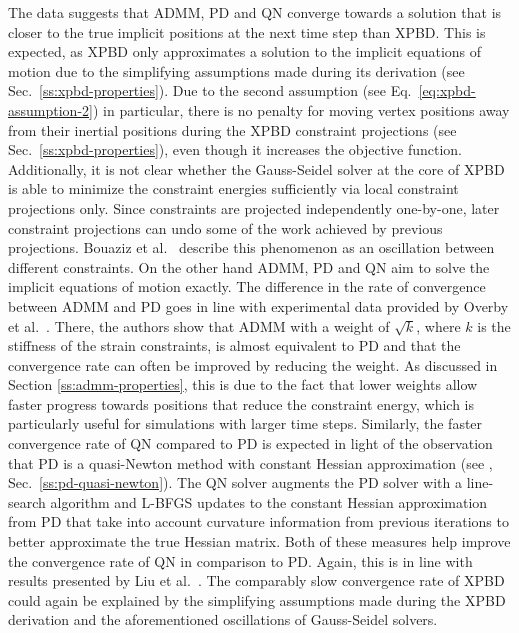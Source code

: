 The data suggests that ADMM, PD and QN converge towards a solution that is closer to the true implicit positions at the next time step than XPBD. This is expected, 
as XPBD only approximates a solution to the implicit equations of motion due to the simplifying assumptions made during its derivation (see Sec.\ \ref{ss:xpbd-properties}).
Due to the second assumption (see Eq.\ \ref{eq:xpbd-assumption-2}) in particular, there is no penalty for moving vertex positions away from their inertial positions during 
the XPBD constraint projections (see Sec.\ \ref{ss:xpbd-properties}), even though it increases the objective function. Additionally,
it is not clear whether the Gauss-Seidel solver at the core of XPBD is able to minimize the constraint energies sufficiently via local constraint projections only.
Since constraints are projected independently one-by-one, later constraint projections can undo some of the work achieved by previous projections. Bouaziz et al.\ 
\cite{bouaziz2014} describe this phenomenon as an oscillation between different constraints. On the other hand ADMM, PD and QN aim to solve the implicit equations 
of motion exactly. The difference in the rate of convergence between ADMM and PD goes in line 
with experimental data provided by Overby et al.\ \cite{overby2017}. There, the authors show that ADMM with a weight of $\sqrt{k}$, where $k$ is the stiffness of the 
strain constraints, is almost equivalent to PD and that the convergence rate can often be improved by reducing the weight. As discussed in 
Section \ref{ss:admm-properties}, this is due to the fact that lower weights allow faster progress towards positions that reduce the constraint energy, which is particularly 
useful for simulations with larger time steps. Similarly, the faster convergence rate of QN compared to PD is expected in light of the observation that PD is a quasi-Newton method 
with constant Hessian approximation (see \cite{liu2017}, Sec.\ \ref{ss:pd-quasi-newton}). The QN solver augments the PD solver with a line-search algorithm and L-BFGS updates to 
the constant Hessian approximation from PD that take into account curvature information from previous iterations to better approximate the true Hessian matrix. Both
of these measures help improve the convergence rate of QN in comparison to PD. Again, this is in line with results presented by Liu et al.\ \cite{liu2017}. The comparably
slow convergence rate of XPBD could again be explained by the simplifying assumptions made during the XPBD derivation and the aforementioned oscillations of Gauss-Seidel
solvers. 

